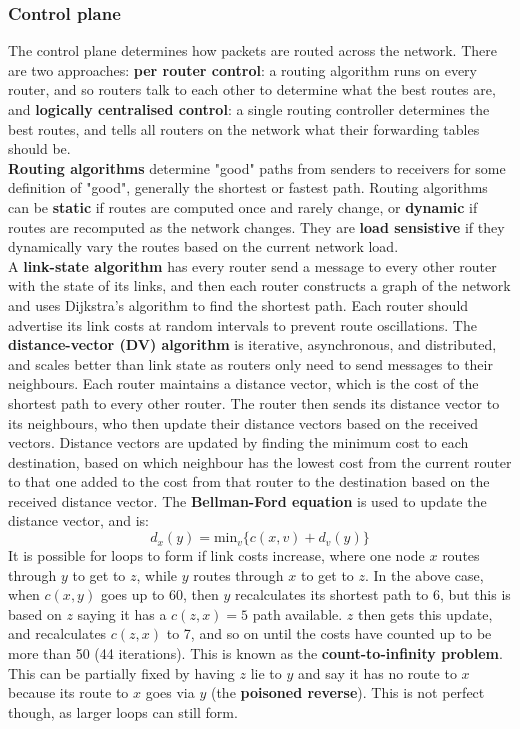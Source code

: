 \subsubsection{Control plane}
The control plane determines how packets are routed across the network. There are two approaches: \textbf{per router control}: a routing algorithm runs on every router, and so routers talk to each other to determine what the best routes are, and \textbf{logically centralised control}: a single routing controller determines the best routes, and tells all routers on the network what their forwarding tables should be.\\
\textbf{Routing algorithms} determine "good" paths from senders to receivers for some definition of "good", generally the shortest or fastest path. Routing algorithms can be \textbf{static} if routes are computed once and rarely change, or \textbf{dynamic} if routes are recomputed as the network changes. They are \textbf{load sensistive} if they dynamically vary the routes based on the current network load.\\
A \textbf{link-state algorithm} has every router send a message to every other router with the state of its links, and then each router constructs a graph of the network and uses Dijkstra's algorithm to find the shortest path. Each router should advertise its link costs at random intervals to prevent route oscillations. The \textbf{distance-vector (DV) algorithm} is iterative, asynchronous, and distributed, and scales better than link state as routers only need to send messages to their neighbours. Each router maintains a distance vector, which is the cost of the shortest path to every other router. The router then sends its distance vector to its neighbours, who then update their distance vectors based on the received vectors. Distance vectors are updated by finding the minimum cost to each destination, based on which neighbour has the lowest cost from the current router to that one added to the cost from that router to the destination based on the received distance vector. The \textbf{Bellman-Ford equation} is used to update the distance vector, and is:
$$
	d_x(y)=\text{min}_v\{c(x,v)+d_v(y)\}
$$
It is possible for loops to form if link costs increase, where one node $x$ routes through $y$ to get to $z$, while $y$ routes through $x$ to get to $z$. In the above case, when $c(x,y)$ goes up to 60, then $y$ recalculates its shortest path to 6, but this is based on $z$ saying it has a $c(z,x)=5$ path available. $z$ then gets this update, and recalculates $c(z,x)$ to 7, and so on until the costs have counted up to be more than 50 (44 iterations). This is known as the \textbf{count-to-infinity problem}. This can be partially fixed by having $z$ lie to $y$ and say it has no route to $x$ because its route to $x$ goes via $y$ (the \textbf{poisoned reverse}). This is not perfect though, as larger loops can still form.\\
